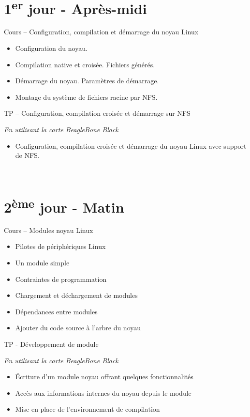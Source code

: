 \documentclass[a4paper,12pt,obeyspaces,spaces,hyphens]{article}
\begin{document}
\section{1\textsuperscript{er} jour - Après-midi}
\feagendatwocolumn
{Cours – Configuration, compilation et démarrage du noyau Linux}
{
  \begin{itemize}
  \item Configuration du noyau.
  \item Compilation native et croisée. Fichiers générés.
  \item Démarrage du noyau. Paramètres de démarrage.
  \item Montage du système de fichiers racine par NFS.
  \end{itemize}
}
{TP – Configuration, compilation croisée et démarrage sur NFS}
{
  {\em En utilisant la carte BeagleBone Black}
  \begin{itemize}
  \item Configuration, compilation croisée et démarrage du noyau Linux
    avec support de NFS.
  \end{itemize}
}
\\
\section{2\textsuperscript{ème} jour - Matin}

\feagendatwocolumn
{Cours – Modules noyau Linux}
{
  \begin{itemize}
  \item Pilotes de périphériques Linux
  \item Un module simple
  \item Contraintes de programmation
  \item Chargement et déchargement de modules
  \item Dépendances entre modules
  \item Ajouter du code source à l'arbre du noyau
  \end{itemize}
}
{TP - Développement de module}
{
  {\em En utilisant la carte BeagleBone Black}
  \begin{itemize}
  \item Écriture d'un module noyau offrant quelques fonctionnalités
  \item Accès aux informations internes du noyau depuis le module
  \item Mise en place de l'environnement de compilation
  \end{itemize}
}
\end{document}
